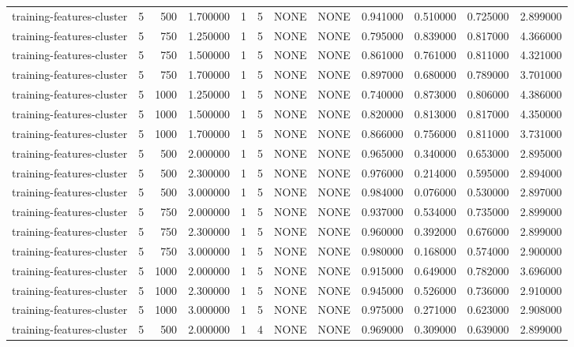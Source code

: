 \begin{tabular}{lrrrllllrrrr}
training-features-cluster & 5 & 500 & 1.700000 & 1 & 5 & NONE & NONE & 0.941000 & 0.510000 & 0.725000 & 2.899000 \\
training-features-cluster & 5 & 750 & 1.250000 & 1 & 5 & NONE & NONE & 0.795000 & 0.839000 & 0.817000 & 4.366000 \\
training-features-cluster & 5 & 750 & 1.500000 & 1 & 5 & NONE & NONE & 0.861000 & 0.761000 & 0.811000 & 4.321000 \\
training-features-cluster & 5 & 750 & 1.700000 & 1 & 5 & NONE & NONE & 0.897000 & 0.680000 & 0.789000 & 3.701000 \\
training-features-cluster & 5 & 1000 & 1.250000 & 1 & 5 & NONE & NONE & 0.740000 & 0.873000 & 0.806000 & 4.386000 \\
training-features-cluster & 5 & 1000 & 1.500000 & 1 & 5 & NONE & NONE & 0.820000 & 0.813000 & 0.817000 & 4.350000 \\
training-features-cluster & 5 & 1000 & 1.700000 & 1 & 5 & NONE & NONE & 0.866000 & 0.756000 & 0.811000 & 3.731000 \\
training-features-cluster & 5 & 500 & 2.000000 & 1 & 5 & NONE & NONE & 0.965000 & 0.340000 & 0.653000 & 2.895000 \\
training-features-cluster & 5 & 500 & 2.300000 & 1 & 5 & NONE & NONE & 0.976000 & 0.214000 & 0.595000 & 2.894000 \\
training-features-cluster & 5 & 500 & 3.000000 & 1 & 5 & NONE & NONE & 0.984000 & 0.076000 & 0.530000 & 2.897000 \\
training-features-cluster & 5 & 750 & 2.000000 & 1 & 5 & NONE & NONE & 0.937000 & 0.534000 & 0.735000 & 2.899000 \\
training-features-cluster & 5 & 750 & 2.300000 & 1 & 5 & NONE & NONE & 0.960000 & 0.392000 & 0.676000 & 2.899000 \\
training-features-cluster & 5 & 750 & 3.000000 & 1 & 5 & NONE & NONE & 0.980000 & 0.168000 & 0.574000 & 2.900000 \\
training-features-cluster & 5 & 1000 & 2.000000 & 1 & 5 & NONE & NONE & 0.915000 & 0.649000 & 0.782000 & 3.696000 \\
training-features-cluster & 5 & 1000 & 2.300000 & 1 & 5 & NONE & NONE & 0.945000 & 0.526000 & 0.736000 & 2.910000 \\
training-features-cluster & 5 & 1000 & 3.000000 & 1 & 5 & NONE & NONE & 0.975000 & 0.271000 & 0.623000 & 2.908000 \\
training-features-cluster & 5 & 500 & 2.000000 & 1 & 4 & NONE & NONE & 0.969000 & 0.309000 & 0.639000 & 2.899000 \\

\end{tabular}
